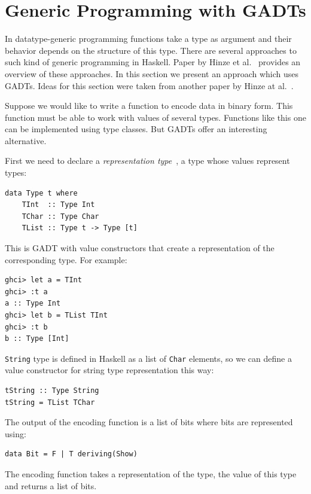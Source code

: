 \documentclass{tmr}
\newcommand{\italic}[1]{\textit{#1}}
\begin{document}
\section{Generic Programming with GADTs}
\label{sec:generic_programming}

In datatype-generic programming functions take a type as argument and their behavior depends on the structure of this type. There are several approaches to such kind of generic programming in Haskell. Paper by Hinze et al.~\cite{generic_programming} provides an overview of these approaches. In this section we present an approach which uses GADTs. Ideas for this section were taken from another paper by Hinze at al.~\cite{fun_with_phantom_types}.

Suppose we would like to write a function to encode data in binary form. This function must be able to work with values of several types. Functions like this one can be implemented using type classes. But GADTs offer an interesting alternative.

First we need to declare a \italic{representation type}~\cite{replib}, a type whose values represent types:

\begin{Verbatim}
data Type t where
    TInt  :: Type Int
    TChar :: Type Char
    TList :: Type t -> Type [t]
\end{Verbatim}

This is GADT with value constructors that create a representation of the corresponding type. For example:

\begin{Verbatim}
ghci> let a = TInt
ghci> :t a
a :: Type Int
ghci> let b = TList TInt
ghci> :t b
b :: Type [Int]
\end{Verbatim}

\verb|String| type is defined in Haskell as a list of \verb|Char| elements, so we can define a value constructor for string type representation this way:

\begin{Verbatim}
tString :: Type String
tString = TList TChar
\end{Verbatim}

The output of the encoding function is a list of bits where bits are represented using:

\begin{Verbatim}
data Bit = F | T deriving(Show)
\end{Verbatim}

The encoding function takes a representation of the type, the value of this type and returns a list of bits.
\end{document}
